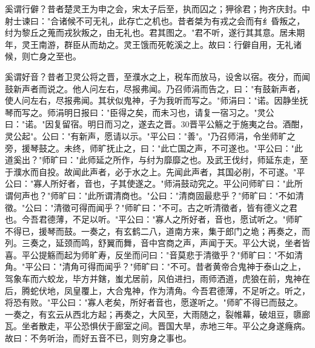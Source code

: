 \documentclass[]{article}
\begin{document}
奚谓行僻？昔者楚灵王为申之会，宋太子后至，执而囚之；狎徐君；拘齐庆封。中射士谏曰："合诸候不可无礼，此存亡之机也。昔者桀为有戎之会而有纟昏叛之，纣为黎丘之蒐而戎狄叛之，由无礼也。君其图之。"君不听，遂行其其意。居未期年，灵王南游，群臣从而劫之。灵王饿而死乾溪之上。故曰：行僻自用，无礼诸候，则亡身之至也。

奚谓好音？昔者卫灵公将之晋，至濮水之上，税车而放马，设舍以宿。夜分，而闻鼓新声者而说之。他人问左右，尽报弗闻。乃召师涓而告之，曰："有鼓新声者，使人问左右，尽报弗闻。其状似鬼神，子为我听而写之。"师涓曰："诺。因静坐抚琴而写之。师涓明日报曰："臣得之矣，而未习也，请复一宿习之。"灵公曰："诺。"因复留宿。明日而习之，遂去之晋。30晋平公觞之于施夷之台。酒酣，灵公起"。公曰："有新声，愿请以示。"平公曰："善"。"乃召师涓，令坐师旷之旁，援琴鼓之。未终，师旷抚止之，曰："此亡国之声，不可遂也。"平公曰："此道奚出？"师旷曰："此师延之所作，与纣为靡靡之也。及武王伐纣，师延东走，至于濮水而自投。故闻此声者，必于水之上。先闻此声者，其国必削，不可遂。"平公曰："寡人所好者，音也，子其使遂之。"师涓鼓动究之。平公问师旷曰："此所谓何声也？"师旷曰："此所谓清商也。"公曰："清商固最悲乎？"师旷曰："不如清徵。"公曰："清徵可得而闻乎？"师旷曰："不可。古之听清徵者，皆有德义之君也。今吾君德薄，不足以听。"平公曰："寡人之所好者，音也，愿试听之。"师旷不得已，援琴而鼓。一奏之，有玄鹤二八，道南方来，集于郎门之垝；再奏之，而列。三奏之，延颈而鸣，舒翼而舞，音中宫商之声，声闻于天。平公大说，坐者皆喜。平公提觞而起为师旷寿，反坐而问曰："音莫悲于清徵乎？"师旷曰："不如清角。"平公曰："清角可得而闻乎？"师旷曰："不可。昔者黄帝合鬼神于泰山之上，驾象车而六蛟龙，毕方并鎋，蚩尤居前，风伯进扫，雨师洒道，虎狼在前，鬼神在后，腾蛇伏地，凤皇覆上，大合鬼神，作为清角。今吾君德薄，不足听之。听之，将恐有败。"平公曰："寡人老矣，所好者音也，愿遂听之。"师旷不得已而鼓之。一奏之，有玄云从西北方起；再奏之，大风至，大雨随之，裂帷幕，破俎豆，隳廊瓦。坐者散走，平公恐惧伏于廊室之间。晋国大旱，赤地三年。平公之身遂癃病。故曰：不务听治，而好五音不已，则穷身之事也。
\end{document}
